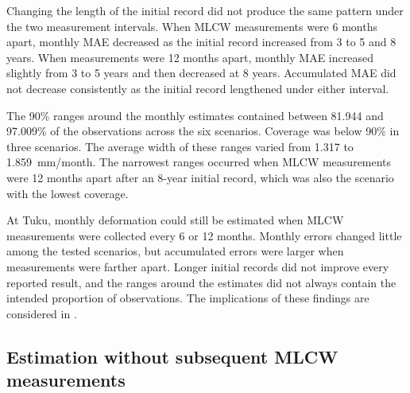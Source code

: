 Changing the length of the initial record did not produce the same pattern under the two measurement intervals. When MLCW measurements were 6 months apart, monthly MAE decreased as the initial record increased from 3 to 5 and 8 years. When measurements were 12 months apart, monthly MAE increased slightly from 3 to 5 years and then decreased at 8 years. Accumulated MAE did not decrease consistently as the initial record lengthened under either interval.

The 90\% ranges around the monthly estimates contained between 81.944 and 97.009\% of the observations across the six scenarios. Coverage was below 90\% in three scenarios. The average width of these ranges varied from 1.317 to 1.859~mm/month. The narrowest ranges occurred when MLCW measurements were 12 months apart after an 8-year initial record, which was also the scenario with the lowest coverage.

At Tuku, monthly deformation could still be estimated when MLCW measurements were collected every 6 or 12 months. Monthly errors changed little among the tested scenarios, but accumulated errors were larger when measurements were farther apart. Longer initial records did not improve every reported result, and the ranges around the estimates did not always contain the intended proportion of observations. The implications of these findings are considered in .

\FloatBarrier

\subsection{Estimation without subsequent MLCW measurements}
\label{subsec:results_no_subsequent_mlcw}

